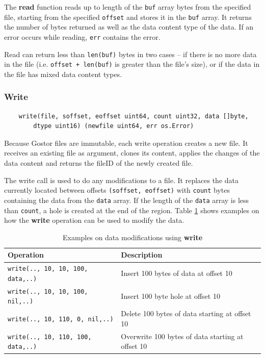 \documentclass[11pt]{p9article}
\begin{document}
The {\bfseries read} function reads up to length of the \verb|buf|
array bytes from the specified file, starting from the specified
\verb|offset| and stores it in the \verb|buf| array. It returns the
number of bytes returned as well as the data content type of the data.
If an error occurs while reading, \verb|err| contains the error.

Read can return less than \verb|len(buf)| bytes in two cases -- if there is no
more data in the file (i.e. \verb|offset + len(buf)| is greater than the
file's size), or if the data in the file has mixed data content types.

\subsubsection{Write}

\begin{verbatim}
    write(file, soffset, eoffset uint64, count uint32, data []byte,
        dtype uint16) (newfile uint64, err os.Error)
\end{verbatim}

Because Gostor files are immutable, each write operation creates a new
file. It receives an existing file as argument, clones its content,
applies the changes of the data content and returns the fileID of the
newly created file.

The write call is used to do any modifications to a file. It replaces
the data currently located between offsets \verb|(soffset, eoffset)|
with \verb|count| bytes containing the data from the \verb|data|
array. If the length of the \verb|data| array is less than
\verb|count|, a hole is created at the end of the region. Table
\ref{tab:write} shows examples on how the {\bfseries write} operation
can be used to modify the data.

\begin{table}[ht]
\begin{center}
\begin{tabular}{lp{8cm}}
Operation & Description \\
\hline
\verb|write(.., 10, 10, 100, data,..)| & Insert 100 bytes of
		data at offset 10 \\
\verb|write(.., 10, 10, 100, nil,..)| & Insert 100 byte hole at
		offset 10 \\
\verb|write(.., 10, 110, 0, nil,..)| & Delete 100 bytes of data
		starting at offset 10 \\
\verb|write(.., 10, 110, 100, data,..)| & Overwrite 100 bytes of data
		starting at offset 10 \\
\end{tabular}
\caption{Examples on data modifications using {\bfseries write}}
\label{tab:write}
\end{center}
\end{table}
\end{document}
